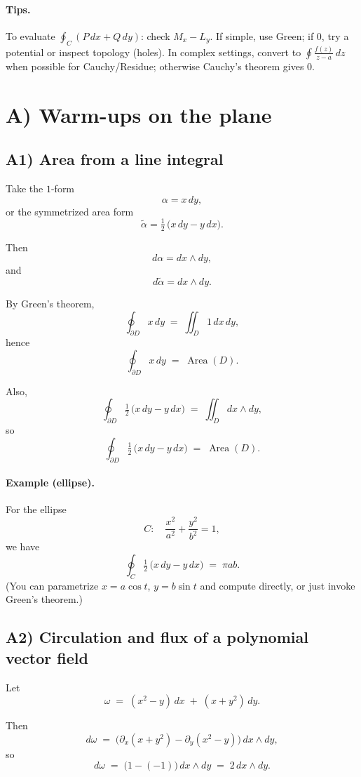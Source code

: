 \documentclass[11pt]{article}
\begin{document}
\paragraph{Tips.}
To evaluate $\oint_C (P\,dx+Q\,dy)$: check $M_x-L_y$. If simple, use Green; if $0$, try a potential or inspect topology (holes).
In complex settings, convert to $\oint \frac{f(z)}{z-a}\,dz$ when possible for Cauchy/Residue; otherwise Cauchy’s theorem gives $0$.

\section*{A) Warm-ups on the plane}

\subsection*{A1) Area from a line integral}

Take the $1$-form
\[
\alpha = x\,dy,
\]
or the symmetrized area form
\[
\tilde\alpha = \tfrac{1}{2}\,\bigl(x\,dy - y\,dx\bigr).
\]

Then
\[
d\alpha = dx \wedge dy,
\]
and
\[
d\tilde\alpha = dx \wedge dy.
\]

By Green's theorem,
\[
\oint_{\partial D} x\,dy \;=\; \iint_{D} 1\,dx\,dy,
\]
hence
\[
\oint_{\partial D} x\,dy \;=\; \operatorname{Area}(D).
\]

Also,
\[
\oint_{\partial D} \tfrac{1}{2}\,\bigl(x\,dy - y\,dx\bigr) \;=\; \iint_{D} dx \wedge dy,
\]
so
\[
\oint_{\partial D} \tfrac{1}{2}\,\bigl(x\,dy - y\,dx\bigr) \;=\; \operatorname{Area}(D).
\]

\paragraph{Example (ellipse).}
For the ellipse
\[
C:\quad \frac{x^{2}}{a^{2}} + \frac{y^{2}}{b^{2}} = 1,
\]
we have
\[
\oint_{C} \tfrac{1}{2}\,\bigl(x\,dy - y\,dx\bigr) \;=\; \pi a b.
\]
(You can parametrize $x=a\cos t$, $y=b\sin t$ and compute directly, or just invoke Green's theorem.)

\subsection*{A2) Circulation and flux of a polynomial vector field}

Let
\[
\omega \;=\; (x^{2} - y)\,dx \;+\; (x + y^{2})\,dy.
\]

Then
\[
d\omega \;=\; \bigl(\partial_{x}(x + y^{2}) - \partial_{y}(x^{2} - y)\bigr)\,dx\wedge dy,
\]
so
\[
d\omega \;=\; \bigl(1 - (-1)\bigr)\,dx\wedge dy \;=\; 2\,dx\wedge dy.
\]
\end{document}
